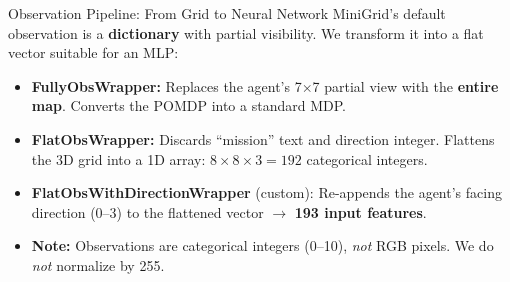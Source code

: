 \documentclass[11pt,aspectratio=169]{beamer}
\begin{document}
\begin{frame}{Observation Pipeline: From Grid to Neural Network}
    MiniGrid's default observation is a \textbf{dictionary} with partial visibility. We transform it into a flat vector suitable for an MLP:

    \vspace{0.2cm}
    \centering

    \vspace{0.3cm}
    \begin{itemize}
        \item \textbf{FullyObsWrapper:} Replaces the agent's 7$\times$7 partial view with the \textbf{entire map}. Converts the POMDP into a standard MDP.
        \item \textbf{FlatObsWrapper:} Discards ``mission'' text and direction integer. Flattens the 3D grid into a 1D array: $8 \times 8 \times 3 = 192$ categorical integers.
        \item \textbf{FlatObsWithDirectionWrapper} (custom): Re-appends the agent's facing direction (0--3) to the flattened vector $\to$ \textbf{193 input features}.
        \item \textbf{Note:} Observations are categorical integers (0--10), \textit{not} RGB pixels. We do \textit{not} normalize by 255.
    \end{itemize}
\end{frame}
\end{document}
